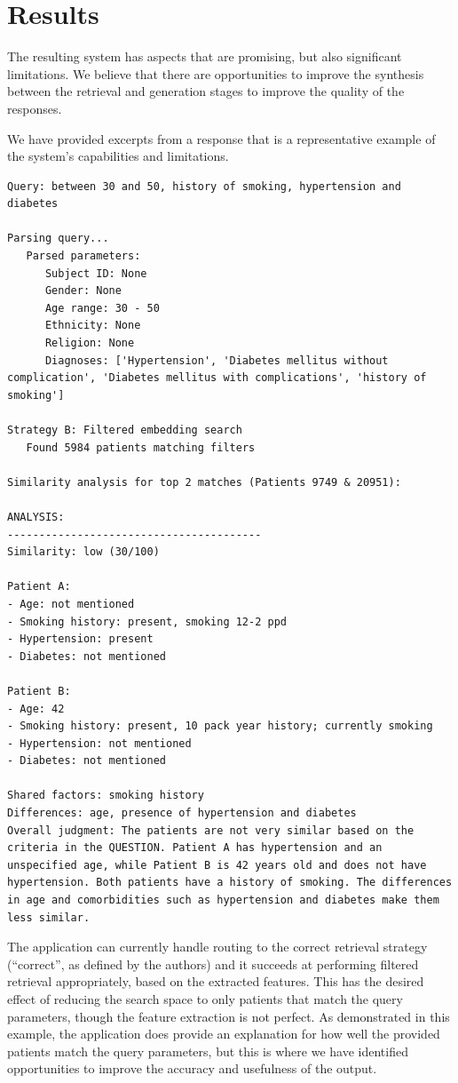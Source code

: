 \documentclass[acmtog]{acmart}
\begin{document}
\section{Results}

The resulting system has aspects that are promising, but also significant limitations. We believe that there are opportunities to improve the synthesis between the retrieval and generation stages to improve the quality of the responses.

We have provided excerpts from a response that is a representative example of the system's capabilities and limitations.

\begin{lstlisting}
Query: between 30 and 50, history of smoking, hypertension and diabetes

Parsing query...
   Parsed parameters:
      Subject ID: None
      Gender: None
      Age range: 30 - 50
      Ethnicity: None
      Religion: None
      Diagnoses: ['Hypertension', 'Diabetes mellitus without complication', 'Diabetes mellitus with complications', 'history of smoking']

Strategy B: Filtered embedding search
   Found 5984 patients matching filters

Similarity analysis for top 2 matches (Patients 9749 & 20951):

ANALYSIS:
----------------------------------------
Similarity: low (30/100)

Patient A:
- Age: not mentioned
- Smoking history: present, smoking 12-2 ppd
- Hypertension: present
- Diabetes: not mentioned

Patient B:
- Age: 42
- Smoking history: present, 10 pack year history; currently smoking
- Hypertension: not mentioned
- Diabetes: not mentioned

Shared factors: smoking history
Differences: age, presence of hypertension and diabetes
Overall judgment: The patients are not very similar based on the criteria in the QUESTION. Patient A has hypertension and an unspecified age, while Patient B is 42 years old and does not have hypertension. Both patients have a history of smoking. The differences in age and comorbidities such as hypertension and diabetes make them less similar.
\end{lstlisting}

The application can currently handle routing to the correct retrieval strategy (``correct'', as defined by the authors) and it succeeds at performing filtered retrieval appropriately, based on the extracted features. This has the desired effect of reducing the search space to only patients that match the query parameters, though the feature extraction is not perfect. As demonstrated in this example, the application does provide an explanation for how well the provided patients match the query parameters, but this is where we have identified opportunities to improve the accuracy and usefulness of the output.
\end{document}

